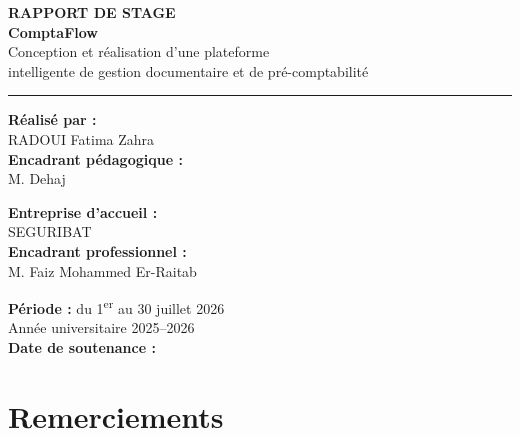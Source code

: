 \documentclass[12pt,a4paper,oneside]{report}
\newcommand{\Auteur}{RADOUI Fatima Zahra}
\newcommand{\EntrepriseAccueil}{SEGURIBAT}
\newcommand{\EncadrantPedagogique}{M. Dehaj}
\newcommand{\EncadrantEntreprise}{M. Faiz Mohammed Er-Raitab}
\newcommand{\AnneeUniversitaire}{2025--2026}
\newcommand{\DateSoutenance}{}
\newcommand{\PeriodeProjet}{du 1\textsuperscript{er} au 30 juillet 2026}
\newcommand{\TypeRapport}{RAPPORT DE STAGE}
\newcommand{\SousTitreRapport}{Conception et réalisation d'une plateforme\\
  intelligente de gestion documentaire et de pré-comptabilité}
\newlength{\CouvertureEspaceAvantTitre}
\newlength{\CouvertureEspaceAvantInformations}
\begin{document}
\begin{titlepage}
\begin{center}
    \vspace{\CouvertureEspaceAvantTitre}
    {\fontsize{17}{20}\selectfont\bfseries \TypeRapport}\\[0.32cm]
    {\fontsize{43}{47}\selectfont\bfseries
      \textcolor{ComptaBlue}{Compta}\textcolor{ComptaGreen}{Flow}}\\[0.35cm]
    {\fontsize{14}{18}\selectfont \SousTitreRapport}

    \vspace{0.72cm}
    {\color{ComptaBlue}\rule{0.82\textwidth}{0.75pt}}
  \end{center}

  \vspace{\CouvertureEspaceAvantInformations}

  \noindent
  \begin{minipage}[t]{0.46\textwidth}
    \raggedright
    \textbf{Réalisé par :}\\[0.18cm]
    \Auteur\\[0.55cm]
    \textbf{Encadrant pédagogique :}\\[0.18cm]
    \EncadrantPedagogique
  \end{minipage}%
  \hfill
  \begin{minipage}[t]{0.43\textwidth}
    \raggedright
    \textbf{Entreprise d'accueil :}\\[0.18cm]
    \EntrepriseAccueil\\[0.55cm]
    \textbf{Encadrant professionnel :}\\[0.18cm]
    \EncadrantEntreprise
  \end{minipage}

  \vfill
  \begin{center}
    \textbf{Période :} \PeriodeProjet\\[0.28cm]
    Année universitaire \AnneeUniversitaire
    \ifx\DateSoutenance\empty\else
      \\[0.28cm]\textbf{Date de soutenance :} \DateSoutenance
    \fi
  \end{center}
  \restoregeometry
\end{titlepage}

\hypersetup{pageanchor=true}

\chapter*{Remerciements}
\end{document}
